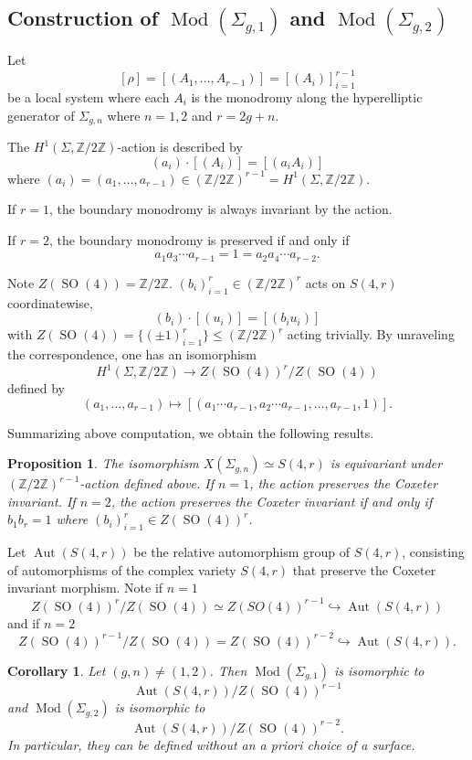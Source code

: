 \documentclass[11pt]{amsart}
\numberwithin{theorem}{section}
\newtheorem{proposition}[theorem]{Proposition}
\newtheorem{corollary}[theorem]{Corollary}
\theoremstyle{definition}
\theoremstyle{remark}
\newcommand{\Z}{{\mathbb{Z}}}
\DeclareMathOperator{\Aut}{Aut}
\DeclareMathOperator{\Mod}{Mod}
\DeclareMathOperator{\SO}{SO}
\newcommand{\<}{\langle}
\renewcommand{\>}{\rangle}
\begin{document}
\subsection{Construction of $\Mod(\Sigma_{g, 1})$ and $\Mod(\Sigma_{g, 2})$}
Let
\[
[\rho] = [(A_1, \ldots, A_{r-1})] = [(A_i)]_{i=1}^{r-1}
\]
be a local system where each $A_i$ is the monodromy along the hyperelliptic generator of $\Sigma_{g, n}$ where $n = 1, 2$ and $r = 2g + n$. 

The $H^1(\Sigma, \Z / 2\Z)$-action is described by
\[
(a_i) \cdot [(A_i)] = [(a_i A_i)]
\]
where $(a_i) = (a_1, \ldots, a_{r-1}) \in (\Z / 2\Z)^{r-1} = H^1(\Sigma, \Z / 2\Z)$.

If $r = 1$, the boundary monodromy is always invariant by the action. 

If $r = 2$, the boundary monodromy is preserved if and only if 
\[
a_1a_3 \cdots a_{r-1} = 1 = a_2a_4 \cdots a_{r-2}.
\]

Note $Z(\SO(4)) = \Z / 2\Z$. $(b_i)_{i=1}^r \in (\Z / 2\Z)^r$ acts on $S(4, r)$ coordinatewise,
\[
(b_i) \cdot [(u_i)] = [(b_i u_i)]
\]
with $Z(\SO(4)) = \{(\pm1)_{i=1}^r \} \leq (\Z / 2\Z)^r$ acting trivially. By unraveling the correspondence, one has an isomorphism
\[
H^1(\Sigma, \Z / 2\Z) \rightarrow Z(\SO(4))^r \slash Z(\SO(4))
\]
defined by
\[
(a_1, \ldots, a_{r-1}) \mapsto [(a_1\cdots a_{r-1}, a_2 \cdots a_{r-1}, \ldots, a_{r-1}, 1)].
\]

Summarizing above computation, we obtain the following results.

\begin{proposition}
    The isomorphism $X(\Sigma_{g, n}) \simeq S(4, r)$ is equivariant under $(\Z / 2\Z)^{r-1}$-action defined above. If $n = 1$, the action preserves the Coxeter invariant. If $n = 2$, the action preserves the Coxeter invariant if and only if $b_1 b_r = 1$ where $(b_i)_{i=1}^r \in Z(\SO(4))^r$. 
\end{proposition}

Let $\Aut(S(4,r))$ be the relative automorphism group of $S(4, r)$, consisting of automorphisms of the complex variety $S(4, r)$ that preserve the Coxeter invariant morphism. Note if $n = 1$
\[
Z(\SO(4))^r / Z(\SO(4)) \simeq Z(SO(4))^{r-1} \hookrightarrow \Aut(S(4,r))
\]
and if $n = 2$
\[
Z(\SO(4))^{r-1} / Z(\SO(4)) = Z(\SO(4))^{r-2} \hookrightarrow \Aut(S(4,r)). 
\]

\begin{corollary}\label{mcg}
    Let $(g, n) \neq (1, 2)$. Then $\Mod(\Sigma_{g, 1})$ is isomorphic to
    \[
    \Aut(S(4,r)) / Z(\SO(4))^{r-1}
    \]
    and $\Mod(\Sigma_{g, 2})$ is isomorphic to
    \[
    \Aut(S(4,r)) / Z(\SO(4))^{r-2}.
    \]
    In particular, they can be defined without an a priori choice of a surface.
\end{corollary}
\end{document}
